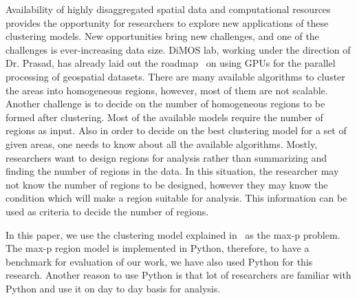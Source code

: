 \documentclass[conference]{IEEEtran}
\begin{document}
Availability of highly disaggregated spatial data and computational resources
provides the opportunity for researchers to explore new applications of these
clustering models. New opportunities bring new challenges, and one of the
challenges is ever-increasing data size. DiMOS lab, working under the direction of Dr. Prasad, has already laid out the roadmap~\cite{r34,r35} on using GPUs for the parallel processing of geospatial datasets. There are many available algorithms to cluster the areas into homogeneous regions, however, most of them are not
scalable. Another challenge is to decide on the number of homogeneous regions to
be formed after clustering. Most of the available models require the number of
regions as input. Also in order to decide on the best clustering model for a set
of given areas, one needs to know about all the available algorithms. Mostly,
researchers want to design regions for analysis rather than summarizing and
finding the number of regions in the data. In this situation, the researcher may not
know the number of regions to be designed, however they may know the condition
which will make a region suitable for analysis. This information can be used as
criteria to decide the number of regions.

In this paper, we use the clustering model explained in~\cite{r1} as the max-p
problem. The max-p region model is implemented in Python, therefore, to have a benchmark for evaluation of our work, we have also used Python for this research. Another reason to use Python is that lot of researchers are familiar with Python and use it on day to day basis for analysis. 
\end{document}
